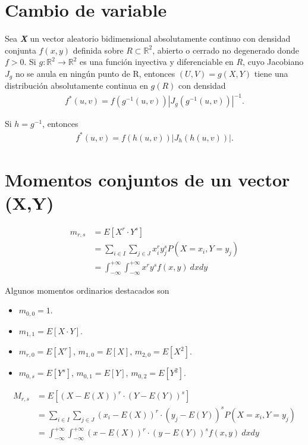 \section{Cambio de variable}

\begin{prop}
Sea \textbf{\textit{X}} un vector aleatorio bidimensional absolutamente continuo con densidad conjunta $f(x,y)$ definida sobre $R \subset \mathbb{R}^2$, abierto o cerrado no degenerado donde $f > 0$. Si $g : \mathbb{R}^2 \longrightarrow \mathbb{R}^2$ es una función inyectiva y diferenciable en $R$, cuyo Jacobiano $J_g$ no se anula en ningún punto de R, entonces $(U,V) = g(X,Y)$ tiene una distribución absolutamente continua en $g(R)$ con densidad
\begin{align*}
    f^*(u,v) = f(g^{-1}(u,v))|J_g(g^{-1}(u,v))|^{-1}.
\end{align*}
\end{prop}
Si $h = g^{-1}$, entonces
\begin{align*}
    f^*(u,v) = f(h(u,v))|J_h(h(u,v))|.
\end{align*}

\section{Momentos conjuntos de un vector (X,Y)}
\begin{defi}
\begin{align*}
    m_{r,s} &= E[X^r \cdot Y^s] \\
    &= \sum_{i\in I}{\sum_{j \in J}{x_i^ry_j^sP(X = x_i, Y = y_j)}} \\
    &= \int_{-\infty}^{+\infty}{\int_{-\infty}^{+\infty}{x^ry^sf(x,y) \ dxdy}}
\end{align*}
\end{defi}
Algunos momentos ordinarios destacados son
\begin{itemize}
    \item $m_{0,0} = 1$.
    \item $m_{1,1} = E[X \cdot Y]$.
    \item $m_{r,0} = E[X^r]$, $m_{1,0} = E[X]$, $m_{2,0} = E[X^2]$.
    \item $m_{0,s} = E[Y^s]$, $m_{0,1} = E[Y]$, $m_{0,2} = E[Y^2]$.
\end{itemize}

\begin{defi}
\begin{align*}
    M_{r,s} &= E[(X - E(X))^r \cdot (Y - E(Y))^s] \\
    &= \sum_{i\in I}{\sum_{j \in J}{(x_i - E(X))^r \cdot (y_j - E(Y))^sP(X = x_i, Y = y_j)}} \\
    &= \int_{-\infty}^{+\infty}{\int_{-\infty}^{+\infty}{(x - E(X))^r \cdot (y - E(Y))^sf(x,y) \ dxdy}}
\end{align*}
\end{defi}

